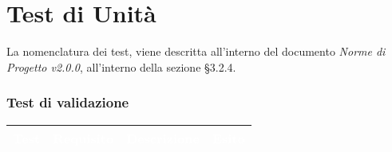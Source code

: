 \section{Test di Unità}
\label{test_u}

La nomenclatura dei test, viene descritta all'interno del documento \textit{Norme di Progetto v2.0.0}, all'interno della sezione §3.2.4.

\subsubsection{Test di validazione}

\begin{longtable}{|m{}|m{}|m{}|m{}|}
\hline
\rowcolor{bluelogo}\textbf{\textcolor{white}{Test}} & \textbf{\textcolor{white}{Requisito}} & \textbf{\textcolor{white}{Descrizione}} & \textbf{\textcolor{white}{Esito}}\\
\hline \hline
\endhead


\end{longtable}
